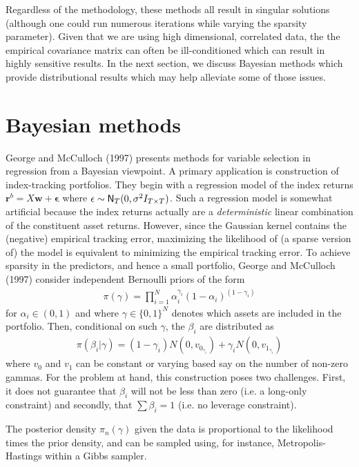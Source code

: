 \documentclass[a4paper, 12pt]{article}
\theoremstyle{plain}
\theoremstyle{definition}
\theoremstyle{remark}
\newcommand{\nm}{{\sf N}}
\begin{document}
Regardless of the methodology, these methods all result in singular solutions (although one could run numerous iterations while varying the sparsity parameter). Given that we are using high dimensional, correlated data, the the empirical covariance matrix can often be ill-conditioned which can result in highly sensitive results. In the next section, we discuss Bayesian methods which provide distributional results which may help alleviate some of those issues.

\section{Bayesian methods}

George and McCulloch (1997) presents methods for variable selection in regression from a Bayesian viewpoint.  A primary application is construction of index-tracking portfolios.  They begin with a regression model of the index returns
$\mathbf{r}^b = X \mathbf{w} + \mathbf{\epsilon}$
where $\mathbf{\epsilon}\sim \nm_T(0,\sigma^2I_{T\times T})$.  Such a regression model is somewhat artificial because the index returns actually are a \emph{deterministic} linear combination of the constituent asset returns.  However, since the Gaussian kernel contains the (negative) empirical tracking error, maximizing the likelihood of (a sparse version of) the model is equivalent to minimizing the empirical tracking error.  To achieve sparsity in the predictors, and hence a small portfolio, George and McCulloch (1997) consider independent Bernoulli priors of the form
\begin{align}
\pi(\gamma) = \prod_{i=1}^N\alpha_i^{\gamma_i}(1-\alpha_i)^{(1-\gamma_i)}
\end{align}
for $\alpha_i\in(0,1)$ and where $\gamma \in \{0,1\}^N$ denotes which assets are included in the portfolio. Then, conditional on such $\gamma$, the $\beta_i$ are distributed as
\begin{align}
\pi(\beta_i \vert \gamma) = (1-\gamma_i)N(0,v_{0_{\gamma_i}}) + \gamma_i N(0,v_{1_{\gamma_i}})
\end{align}
where $v_0$ and $v_1$ can be constant or varying based say on the number of non-zero gammas. For the problem at hand, this construction poses two challenges. First, it does not guarantee that $\beta_i$ will not be less than zero (i.e. a long-only constraint) and secondly, that $\sum\beta_i=1$ (i.e. no leverage constraint).

The posterior density $\pi_n(\gamma)$ given the data is proportional to the likelihood times the prior density, and can be sampled using, for instance, Metropolis-Hastings within a Gibbs sampler.
\end{document}
